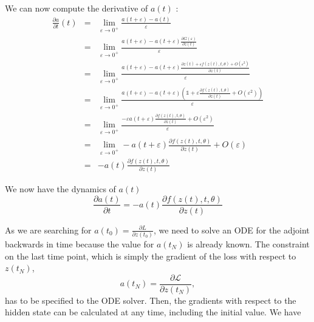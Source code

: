 \documentclass[10pt,a4paper]{article}
\theoremstyle{definition}
\theoremstyle{plain}
\begin{document}
We can now compute the derivative of $a(t)$ :
\begin{eqnarray*}
\frac{\partial a}{\partial t}(t) &=& \lim_{\varepsilon \rightarrow 0^+} \frac{a(t+\varepsilon) - a(t)}{\varepsilon}\\
&=& \lim_{\varepsilon \rightarrow 0^+} \frac{a(t+\varepsilon) - a(t+\varepsilon)\frac{\partial G(\varepsilon)}{\partial z(t)}}{\varepsilon}\\
&=& \lim_{\varepsilon \rightarrow 0^+} \frac{a(t+\varepsilon) - a(t+\varepsilon)\frac{\partial z(t) + \varepsilon f(z(t),t,\theta) + O(\varepsilon^2)}{\partial z(t)}}{\varepsilon} \\
&=& \lim_{\varepsilon \rightarrow 0^+} \frac{a(t+\varepsilon) - a(t+\varepsilon)(\mathds{1} + \varepsilon \frac{\partial f(z(t),t,\theta)} {\partial z(t)}+ O(\varepsilon^2))}{\varepsilon}\\
&=& \lim_{\varepsilon \rightarrow 0^+} \frac{-\varepsilon a(t+\varepsilon) \frac{\partial f(z(t),t,\theta)} {\partial z(t)}+ O(\varepsilon^2)}{\varepsilon}\\
&=& \lim_{\varepsilon \rightarrow 0^+} - a(t+\varepsilon) \frac{\partial f(z(t),t,\theta)} {\partial z(t)}+ O(\varepsilon)\\
&=& -a(t)\frac{\partial f(z(t),t,\theta)} {\partial z(t)}
\end{eqnarray*}

We now have the dynamics of $a(t)$
\begin{equation}
\label{dynat}
\frac{\partial a(t)}{\partial t} = -a(t)\frac{\partial f(z(t),t,\theta)} {\partial z(t)}
\end{equation}
 
As we are searching for $ a(t_0) = \frac{\partial L}{\partial z(t_0)}$, we need to solve an ODE for the adjoint backwards in time because the value for $a(t_N)$ is already known. The constraint on the last time point, which is simply the gradient of the loss with respect to $z(t_N)$, 
\begin{equation*}
a(t_N) = \frac{\partial \mathcal{L}}{\partial z(t_N)},
\end{equation*}
has to be specified to the ODE solver. Then, the gradients with respect to the hidden state can be calculated at any time, including the initial value. We have 
\end{document}
